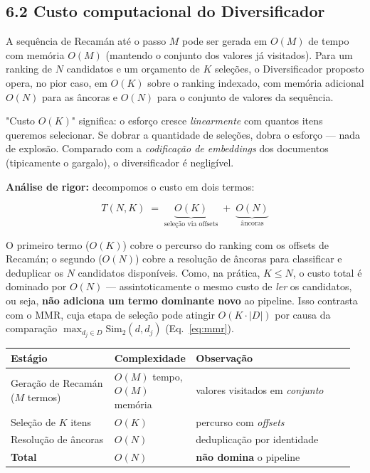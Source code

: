 \subsection*{6.2 Custo computacional do Diversificador}

 A sequência de Recamán até o passo $M$ pode ser gerada em $O(M)$ de
tempo com memória $O(M)$ (mantendo o conjunto dos valores já visitados). Para um
ranking de $N$ candidatos e um orçamento de $K$ seleções, o Diversificador
proposto opera, no pior caso, em $O(K)$ sobre o ranking indexado, com memória
adicional $O(N)$ para as âncoras e $O(N)$ para o conjunto de valores da sequência.

\begin{intuicao}
"Custo $O(K)$" significa: o esforço cresce \emph{linearmente} com quantos itens
queremos selecionar. Se dobrar a quantidade de seleções, dobra o esforço --- nada
de explosão. Comparado com a \emph{codificação de embeddings} dos documentos
(tipicamente o gargalo), o diversificador é negligível.
\end{intuicao}

 \textbf{Análise de rigor:} decompomos o custo em dois termos:

\begin{equation}
\label{eq:cost}
T(N,K) \;=\; \underbrace{O(K)}_{\text{seleção via offsets}}
          \;+\; \underbrace{O(N)}_{\text{âncoras}}
\end{equation}

\noindent O primeiro termo ($O(K)$) cobre o percurso do ranking com os offsets de
Recamán; o segundo ($O(N)$) cobre a resolução de âncoras para classificar e deduplicar
os $N$ candidatos disponíveis. Como, na prática, $K \leq N$, o custo total é
dominado por $O(N)$ --- assintoticamente o mesmo custo de \emph{ler} os candidatos,
ou seja, \textbf{não adiciona um termo dominante novo} ao pipeline. Isso contrasta
com o MMR, cuja etapa de seleção pode atingir $O(K \cdot |D|)$ por causa da
comparação $\max_{d_j \in D} \text{Sim}_2(d,d_j)$ (Eq.~\ref{eq:mmr}).

\begin{center}
\small
\begin{tabular}{@{}L{0.30\linewidth}L{0.20\linewidth}L{0.46\linewidth}@{}}
\toprule
\textbf{Estágio} & \textbf{Complexidade} & \textbf{Observação} \\
\midrule
Geração de Recamán ($M$ termos) & $O(M)$ tempo, $O(M)$ memória & valores visitados em \emph{conjunto} \\
Seleção de $K$ itens & $O(K)$ & percurso com \emph{offsets} \\
Resolução de âncoras & $O(N)$ & deduplicação por identidade \\
\textbf{Total} & $O(N)$ & \textbf{não domina} o pipeline \\
\bottomrule
\end{tabular}
\end{center}

